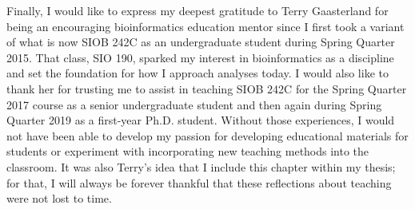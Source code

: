 Finally, I would like to express my deepest gratitude to Terry Gaasterland for being an encouraging bioinformatics education mentor since I first took a variant of what is now SIOB 242C as an undergraduate student during Spring Quarter 2015. That class, SIO 190, sparked my interest in bioinformatics as a discipline and set the foundation for how I approach analyses today. I would also like to thank her for trusting me to assist in teaching SIOB 242C for the Spring Quarter 2017 course as a senior undergraduate student and then again during Spring Quarter 2019 as a first-year Ph.D. student. Without those experiences, I would not have been able to develop my passion for developing educational materials for students or experiment with incorporating new teaching methods into the classroom. It was also Terry’s idea that I include this chapter within my thesis; for that, I will always be forever thankful that these reflections about teaching were not lost to time.
